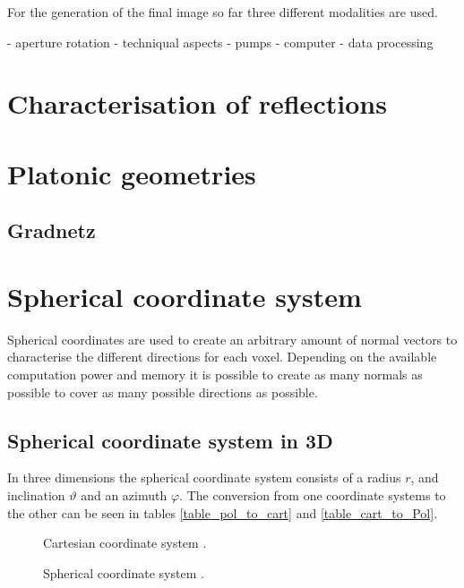 For the generation of the final image so far three different modalities are used. 


- aperture rotation
- techniqual aspects
- pumps
- computer
- data processing




\section{Characterisation of reflections}


\section{Platonic geometries}
\subsection{Gradnetz}


\section{Spherical coordinate system}
Spherical coordinates are used to create an arbitrary amount of normal vectors to characterise the different directions for each voxel. Depending on the available computation power and memory it is possible to create as many normals as possible to cover as many possible directions as possible.


\subsection{Spherical coordinate system in 3D}

In three dimensions the spherical coordinate system consists of a radius $r$, and inclination $\vartheta$ and an azimuth $\varphi$. The conversion from one coordinate systems to the other can be seen in tables \ref{table_pol_to_cart} and \ref{table_cart_to_Pol}.

\begin{figure}[H]
  \centering
  \begin{minipage}[b]{0.45\textwidth}
    \centering
  \caption{Cartesian coordinate system \cite{Prof.Dr.-Ing.GertF.Trommer2013FelderWellen}.}
  \end{minipage}
  \hfill
  \begin{minipage}[b]{0.45\textwidth}
    \centering
  \caption{Spherical coordinate system \cite{Prof.Dr.-Ing.GertF.Trommer2013FelderWellen}.}
  \end{minipage}
    \hfill
\label{polar_cart_systems}
\end{figure}




